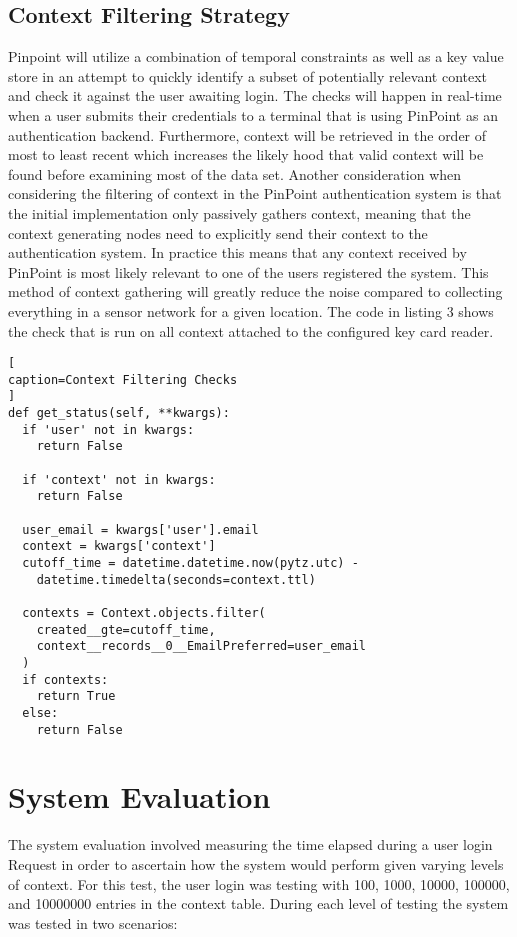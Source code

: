 \documentclass[11pt,journal]{IEEEtran}
\begin{document}
\subsection{Context Filtering Strategy}
Pinpoint will utilize a combination of temporal constraints as well as a key value store in an attempt to quickly identify a subset of potentially relevant context and check it against the user awaiting login.  The checks will happen in real-time when a user submits their credentials to a terminal that is using PinPoint as an authentication backend.  Furthermore, context will be retrieved in the order of most to least recent which increases the likely hood that valid context will be found before examining most of the data set.  Another consideration when considering the filtering of context in the PinPoint authentication system is that the initial implementation only passively gathers context, meaning that the context generating nodes need to explicitly send their context to the authentication system.  In practice this means that any context received by PinPoint is most likely relevant to one of the users registered the system.  This method of context gathering will greatly reduce the noise compared to collecting everything in a sensor network for a given location.  The code in listing 3 shows the check that is run on all context attached to the configured key card reader.

\begin{lstlisting}[
caption=Context Filtering Checks
]
def get_status(self, **kwargs):
  if 'user' not in kwargs:
    return False

  if 'context' not in kwargs:
    return False

  user_email = kwargs['user'].email
  context = kwargs['context']
  cutoff_time = datetime.datetime.now(pytz.utc) - 
    datetime.timedelta(seconds=context.ttl)

  contexts = Context.objects.filter(
    created__gte=cutoff_time, 
    context__records__0__EmailPreferred=user_email
  )
  if contexts:
    return True
  else:
    return False

\end{lstlisting}

\section{System Evaluation}
The system evaluation involved measuring the time elapsed during a user login Request in order to ascertain how the system would perform given varying levels of context.  For this test, the user login was testing with 100, 1000, 10000, 100000, and 10000000 entries in the context table.  During each level of testing the system was tested in two scenarios:
\end{document}
